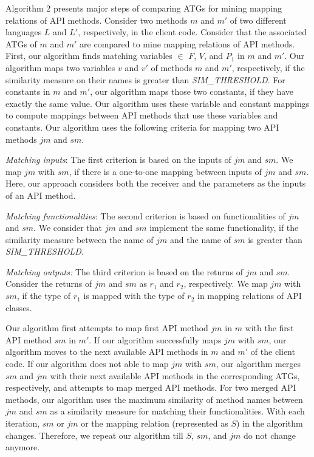 Algorithm 2 presents major steps of comparing ATGs for mining
mapping relations of API methods. Consider two methods $m$ and $m'$
of two different languages $L$ and $L'$, respectively, in the client
code. Consider that the associated ATGs of $m$ and $m'$ are compared
to mine mapping relations of API methods. First, our algorithm finds
matching variables $\in$ $F$, $V$, and $P_1$ in $m$ and $m'$. Our
algorithm maps two variables $v$ and $v'$ of methods $m$ and $m'$,
respectively, if the similarity measure on their names is greater
than \emph{SIM\_THRESHOLD}. For constants in $m$ and $m'$, our
algorithm maps those two constants, if they have exactly the same
value. Our algorithm uses these variable and constant mappings to
compute mappings between API methods that use these variables and
constants. Our algorithm uses the following criteria for mapping two
API methods $jm$ and $sm$.

\emph{Matching inputs}: The first criterion is based on the inputs
of $jm$ and $sm$. We map $jm$ with $sm$, if there is a one-to-one
mapping between inputs of $jm$ and $sm$. Here, our approach
considers both the receiver and the parameters as the inputs of an
API method.

\emph{Matching functionalities}: The second criterion is based on functionalities of
$jm$ and $sm$. We consider that $jm$ and $sm$ implement the same functionality,
if the similarity measure between the name of $jm$ and the name of $sm$ is
greater than \emph{SIM\_THRESHOLD}.

\emph{Matching outputs:} The third criterion is based on the returns of $jm$ and $sm$.
Consider the returns of $jm$ and $sm$ as $r_1$ and $r_2$, respectively. We map $jm$
with $sm$, if the type of $r_1$ is mapped with the type of $r_2$ in
mapping relations of API classes.

Our algorithm first attempts to map first API method $jm$ in $m$
with the first API method $sm$ in $m'$. If our algorithm successfully maps $jm$ with
$sm$, our algorithm moves to the next available API methods in $m$
and $m'$ of the client code. If our algorithm does not able to map $jm$
with $sm$, our algorithm merges $sm$ and $jm$ with their next available API methods
in the corresponding ATGs, respectively, and attempts to map merged API methods.
For two merged API methods, our algorithm uses the
maximum similarity of method names between $jm$ and $sm$ as a
similarity measure for matching their functionalities.
With each iteration, $sm$ or $jm$ or the mapping relation (represented as $S$)
in the algorithm changes. Therefore, we repeat our algorithm
till $S$, $sm$, and $jm$ do not change anymore.

